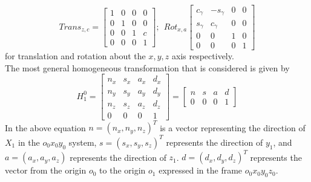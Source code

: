  \begin{equation}\label{transx}
   Trans_{z,c}=\left[\begin{array}{cccc}
                       1 & 0 & 0 & 0 \\
                       0 & 1 & 0 & 0 \\
                       0 & 0 & 1 & c \\
                       0 & 0 & 0 & 1 \end{array}\right];\ \ Rot_{x,a}\left[\begin{array}{cccc}
                                                                            c_\gamma & -s_\gamma & 0 & 0 \\
                                                                            s_\gamma & c_\gamma & 0 & 0 \\
                                                                            0 & 0 & 1 & 0 \\
                                                                            0 & 0 & 0 & 1 \end{array}\right]
 \end{equation} for translation and rotation about the $x,y,z$ axis respectively.\\
 The most general homogeneous transformation that is considered is given by
 \begin{equation}\label{homogen}
   H_1^0=\left[\begin{array}{cccc}
                 n_x & s_x & a_x & d_x \\
                 n_y & s_y & a_y & d_y \\
                 n_z & s_z & a_z & d_z \\
                 0 & 0 & 0 & 1 \end{array}\right]=\left[\begin{array}{cccc}
                                                          n & s & a & d \\
                                                          0 & 0 & 0 & 1 \end{array}\right]
 \end{equation}
 In the above equation $n=(n_x,n_y,n_z)^T$ is a vector representing the direction of $X_1$ in the $o_0x_0y_0$ system, $s=(s_x,s_y,s_z)^T$ represents the direction of $y_1$, and $a=(a_x,a_y,a_z)$ represents the direction of $z_1$. $d=(d_x,d_y,d_z)^T$ represents the vector from the origin $o_0$ to the origin $o_1$ expressed in the frame $o_0x_0y_0z_0$.

